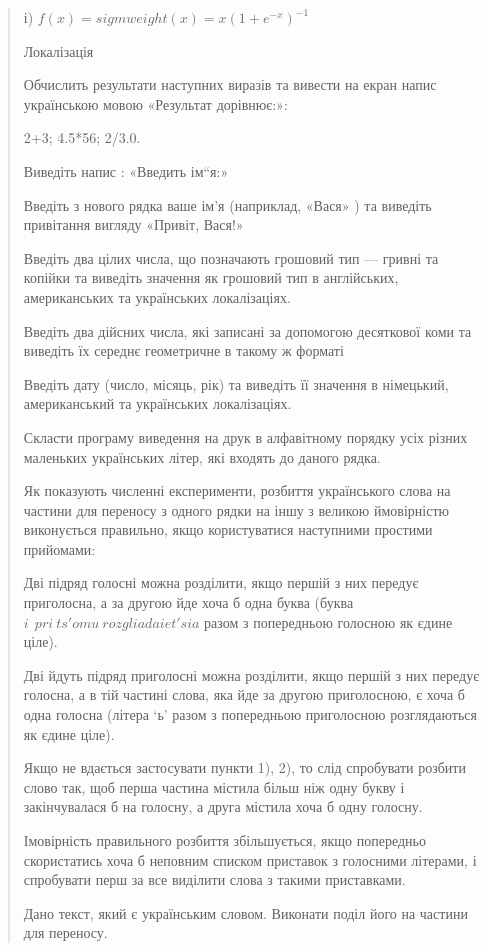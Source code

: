\documentclass[]{article}
\begin{document}
\begin{quote}
і)
\(f\left( x \right) = sigmweight\left( x \right) = x(1 + e^{- x})^{- 1}\)

Локалізація

Обчислить результати наступних виразів та вивести на екран напис
українською мовою «Результат дорівнює:»:

2+3; 4.5*56; 2/3.0.

Виведіть напис : «Введить ім``я:»

Введіть з нового рядка ваше ім'я (наприклад, «Вася» ) та виведіть
привітання вигляду «Привіт, Вася!»

Введіть два цілих числа, що позначають грошовий тип --- гривні та
копійки та виведіть значення як грошовий тип в англійських,
американських та українських локалізаціях.

Введіть два дійсних числа, які записані за допомогою десяткової коми та
виведіть їх середнє геометричне в такому ж форматі

Введіть дату (число, місяць, рік) та виведіть її значення в німецький,
американський та українських локалізаціях.

Скласти програму виведення на друк в алфавітному порядку усіх різних
маленьких українських літер, які входять до даного рядка.

Як показують численні експерименти, розбиття українського слова на
частини для переносу з одного рядки на іншу з великою ймовірністю
виконується правильно, якщо користуватися наступними простими прийомами:

Дві підряд голосні можна розділити, якщо першій з них передує
приголосна, а за другою йде хоча б одна буква (буква
\(i\ \ pri\ ts'omu\ rozgliadaiet'sia\) разом з попередньою голосною як
єдине ціле).

Дві йдуть підряд приголосні можна розділити, якщо першій з них передує
голосна, а в тій частині слова, яка йде за другою приголосною, є хоча б
одна голосна (літера `ь' разом з попередньою приголосною розглядаються
як єдине ціле).

Якщо не вдається застосувати пункти 1), 2), то слід спробувати розбити
слово так, щоб перша частина містила більш ніж одну букву і
закінчувалася б на голосну, а друга містила хоча б одну голосну.

Імовірність правильного розбиття збільшується, якщо попередньо
скористатись хоча б неповним списком приставок з голосними літерами, і
спробувати перш за все виділити слова з такими приставками.

Дано текст, який є українським словом. Виконати поділ його на частини
для переносу.


\end{quote}
\end{document}

